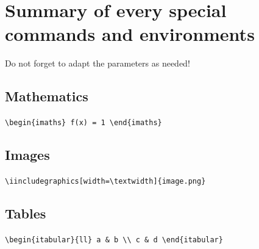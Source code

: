 \documentclass[11pt, a4paper]{article}
\begin{document}


\newpage
\section{Summary of every special commands and environments}
Do not forget to adapt the parameters as needed!

\subsection*{Mathematics}

\hfill
\lstinline[style=custom-latex]|\begin{imaths} f(x) = 1 \end{imaths}|



\subsection*{Images}

\hfill
\lstinline[style=custom-latex]|\iincludegraphics[width=\textwidth]{image.png}|



\subsection*{Tables}

\hfill
\lstinline[style=custom-latex]|\begin{itabular}{ll} a & b \\ c & d \end{itabular}|


\end{document}
